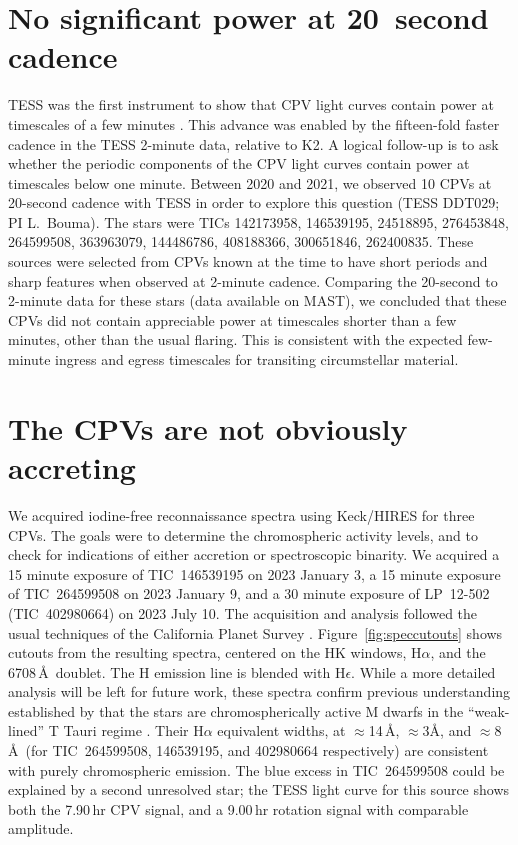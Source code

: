 \documentclass[11pt,twocolumn,tighten,linenumbers]{aastex63}
\begin{document}
\section{No significant power at 20~second cadence}
\label{sec:twentysec}

TESS was the first instrument to show that CPV light curves contain
power at timescales of a few minutes
\citep{2019ApJ...876..127Z,2022AJ....163..144G}.  This advance was
enabled by the fifteen-fold faster cadence in the TESS 2-minute data,
relative to K2.  A logical follow-up is to ask whether the periodic
components of the CPV light curves contain power at timescales below
one minute.  Between 2020 and 2021, we observed 10 CPVs at 20-second
cadence with TESS in order to explore this question (TESS DDT029; PI
L.~Bouma).  The stars were TICs 142173958, 146539195, 24518895,
276453848, 264599508, 363963079, 144486786, 408188366, 300651846,
262400835.  These sources were selected from CPVs known at the time to
have short periods and sharp features when observed at 2-minute
cadence.  Comparing the 20-second to 2-minute data for these stars
(data available on MAST), we concluded that these CPVs did not contain
appreciable power at timescales shorter than a few minutes, other than
the usual flaring.  This is consistent with the expected few-minute
ingress and egress timescales for transiting circumstellar material.


\section{The CPVs are not obviously accreting}
\label{sec:accretion}

We acquired iodine-free reconnaissance spectra using Keck/HIRES for
three CPVs.  The goals were to determine the chromospheric activity
levels, and to check for indications of either accretion or
spectroscopic binarity.  We acquired a 15 minute exposure of
TIC~146539195 on 2023 January 3, a 15 minute exposure of TIC~264599508
on 2023 January 9, and a 30 minute exposure of LP~12-502
(TIC~402980664) on 2023 July 10.  The acquisition and analysis
followed the usual techniques of the California Planet Survey
\citep{2010ApJ...721.1467H}.  Figure~\ref{fig:speccutouts} shows
cutouts from the resulting spectra, centered on the  HK
windows, H$\alpha$, and the  6708\,\AA\ doublet.  The
 H emission line is blended with H$\epsilon$.  While a more
detailed analysis will be left for future work, these spectra confirm
previous understanding established by \citet{2017AJ....153..152S} that
the stars are chromospherically active M dwarfs in the ``weak-lined''
T Tauri regime \citep[e.g.][Figure~15]{2019AJ....157...85B}.  Their
H$\alpha$ equivalent widths, at $\approx$14\,\AA, $\approx$3\AA, and
$\approx$8\,\AA\ (for TIC~264599508, 146539195, and 402980664
respectively) are consistent with purely chromospheric emission.  The
blue excess in TIC~264599508 could be explained by a second unresolved
star; the TESS light curve for this source shows both the 7.90\,hr CPV
signal, and a 9.00\,hr rotation signal with comparable amplitude.
\end{document}
